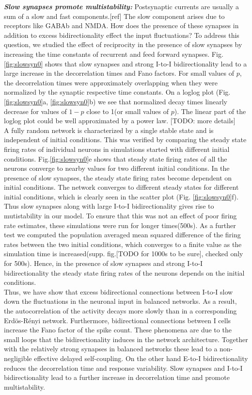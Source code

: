 \emph{\textbf{Slow synapses promote multistability:}} Postsynaptic currents are usually a sum of a slow and fast components.[ref] The slow component arises due to receptors like GABAb and NMDA. How does the presence of these synapses in addition to excess bidirectionality effect the input fluctuations? To address this question, we studied the effect of reciprocity in the presence of slow synapses by increasing the time constants of recurrent and feed forward synapses. Fig.\ref{fig:slowsyn0} shows that slow synapses and strong I-to-I bidirectionality lead to a large increase in the decorrelation times and Fano factors. For small values of $p$, the decorrelation times were approximately overlapping when they were normalized by the synaptic respective time constants. On a loglog plot (Fig. \ref{fig:slowsyn0}a, \ref{fig:slowsyn0}b) we see that normalized decay times linearly decrease for values of $1-p$ close to 1(or small values of $p$). The linear part of the loglog plot could be well approximated by a power law. [TODO: more details]\\
A fully random network is characterized by a single stable state and is independent of initial conditions. This was verified by comparing the steady state firing rates of individual neurons in simulations started with different initial conditions.  Fig.\ref{fig:slowsyn0}e shows that steady state firing rates of all the neurons converge to nearby values for two different initial conditions. In the presence of slow synapses, the steady state firing rates become dependent on initial conditions.
The network converges to different steady states for different initial conditions, which is clearly seen in the scatter plot (Fig. \ref{fig:slowsyn0}f). Thus slow synapses along with large I-to-I bidirectionality gives rise to mutistability in our model. To ensure that this was not an effect of poor firing rate estimates, these simulations were run for longer times(500s). As a further test we computed the population averaged mean squared difference of the firing rates between the two initial conditions, which converges to a finite value as the simulation time is increased(supp. fig.[TODO for 1000s to be sure], checked only for 500s). Hence, in the presence of slow synapses and strong I-to-I bidirectionality the steady state firing rates of the neurons depends on the initial conditions.\\

Thus, we have show that excess bidirectional connections between I-to-I slow down the fluctuations in the neuronal input in balanced networks. As a result, the autocorrelation of the activity decays more slowly than in a corresponding Erdös-Rényi network. Furthermore, bidirectional connections between I cells increase the Fano factor of the spike count. These phenomena are due to the small loops that the bidirectionality induces in the network architecture. Together with the relatively strong synapses in balanced networks these lead to a non-negligible effective delayed self-coupling. On the other hand E-to-I bidirectionality reduces the decorrelation time and response variability. Slow synapses and I-to-I bidirectionality lead to a further increase in decorrelation time and promote multistability.


